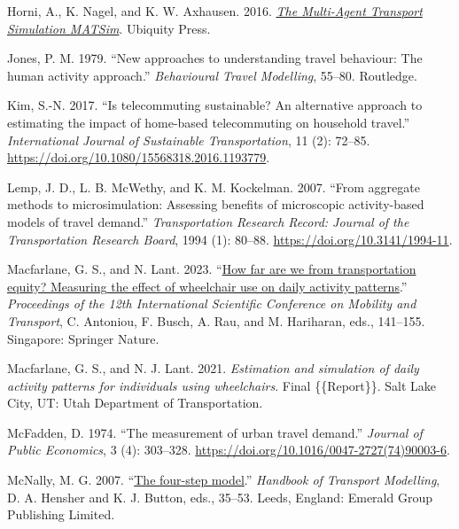 \documentclass[fancy, twoside, mastersfancy, ms]{byuthesis}
\newlength{\cslhangindent}
\newenvironment{CSLReferences}[2] %
 {\begin{list}{}{%
  \setlength{\itemindent}{0pt}
  \setlength{\leftmargin}{0pt}
  \setlength{\parsep}{0pt}
  \ifodd #1
   \setlength{\leftmargin}{\cslhangindent}
   \setlength{\itemindent}{-1\cslhangindent}
  \fi
  \setlength{\itemsep}{#2\baselineskip}}}
 {\end{list}}
\begin{document}
\begin{CSLReferences}{1}{0}
Horni, A., K. Nagel, and K. W. Axhausen. 2016.
\emph{\href{https://doi.org/10.5334/baw}{The {Multi-Agent Transport
Simulation MATSim}}}. Ubiquity Press.

Jones, P. M. 1979. {``New approaches to understanding travel behaviour:
The human activity approach.''} \emph{Behavioural {Travel Modelling}},
55--80. Routledge.

Kim, S.-N. 2017. {``Is telecommuting sustainable? {An} alternative
approach to estimating the impact of home-based telecommuting on
household travel.''} \emph{International Journal of Sustainable
Transportation}, 11 (2): 72--85.
\url{https://doi.org/10.1080/15568318.2016.1193779}.

Lemp, J. D., L. B. McWethy, and K. M. Kockelman. 2007. {``From aggregate
methods to microsimulation: Assessing benefits of microscopic
activity-based models of travel demand.''} \emph{Transportation Research
Record: Journal of the Transportation Research Board}, 1994 (1): 80--88.
\url{https://doi.org/10.3141/1994-11}.

Macfarlane, G. S., and N. Lant. 2023.
{``\href{https://doi.org/10.1007/978-981-19-8361-0_10}{How far are we
from transportation equity? {Measuring} the effect of wheelchair use on
daily activity patterns}.''} \emph{Proceedings of the 12th
{International Scientific Conference} on {Mobility} and {Transport}}, C.
Antoniou, F. Busch, A. Rau, and M. Hariharan, eds., 141--155. Singapore:
Springer Nature.

Macfarlane, G. S., and N. J. Lant. 2021. \emph{Estimation and simulation
of daily activity patterns for individuals using wheelchairs}. Final
\{\{Report\}\}. Salt Lake City, UT: Utah Department of Transportation.

McFadden, D. 1974. {``The measurement of urban travel demand.''}
\emph{Journal of Public Economics}, 3 (4): 303--328.
\url{https://doi.org/10.1016/0047-2727(74)90003-6}.

McNally, M. G. 2007.
{``\href{https://doi.org/10.1108/9780857245670-003}{The four-step
model}.''} \emph{Handbook of {Transport Modelling}}, D. A. Hensher and
K. J. Button, eds., 35--53. Leeds, England: Emerald Group Publishing
Limited.


\end{CSLReferences}
\end{document}
